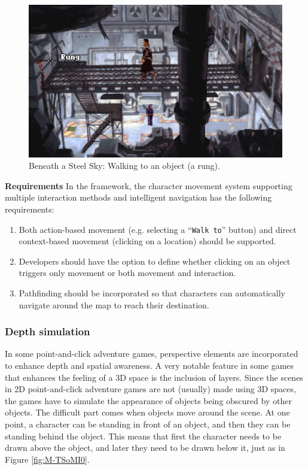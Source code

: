 \begin{figure}[H]
\centering
\includegraphics[width=.8\linewidth]{img/M-BaSS.png}
\caption{Beneath a Steel Sky: Walking to an object (a rung).}
\label{fig:M-BaSS}
\end{figure}

\textbf{Requirements} \quad In the framework, the character movement system supporting multiple interaction methods and intelligent navigation has the following requirements:

\begin{enumerate}[label=\color{teal}\textbf{R{\arabic*}},resume]
  \item \label{intro:req:com+mouse_move} Both action-based movement (e.g. selecting a “\texttt{Walk to}” button) and direct context-based movement (clicking on a location) should be supported.
  \item \label{intro:req:mox_move} Developers should have the option to define whether clicking on an object triggers only movement or both movement and interaction.
  \item \label{intro:req:pathfinding}Pathfinding should be incorporated so that characters can automatically navigate around the map to reach their destination.
\end{enumerate}

\subsubsection{Depth simulation}
In some point-and-click adventure games, perspective elements are incorporated to enhance depth and spatial awareness. 
A very notable feature in some games that enhances the feeling of a 3D space is the inclusion of layers. Since the scenes in 2D point-and-click adventure games are not (usually) made using 3D spaces, the games have to simulate the appearance of objects being obscured by other objects. The difficult part comes when objects move around the scene. At one point, a character can be standing in front of an object, and then they can be standing behind the object. This means that first the character needs to be drawn above the object, and later they need to be drawn below it, just as in Figure \ref{fig:M-TSoMI0}.

